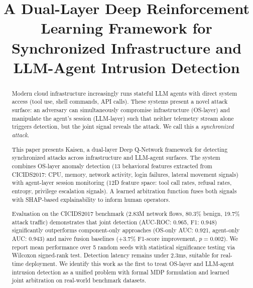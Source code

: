 \documentclass[conference]{IEEEtran}
\begin{document}
\title{A Dual-Layer Deep Reinforcement Learning Framework for Synchronized Infrastructure and LLM-Agent Intrusion Detection}

\author{
}

\maketitle

\begin{abstract}
Modern cloud infrastructure increasingly runs stateful LLM agents with direct system access (tool use, shell commands, API calls). These systems present a novel attack surface: an adversary can simultaneously compromise infrastructure (OS-layer) and manipulate the agent's session (LLM-layer) such that neither telemetry stream alone triggers detection, but the joint signal reveals the attack. We call this a \emph{synchronized attack}.

This paper presents Kaisen, a dual-layer Deep Q-Network framework for detecting synchronized attacks across infrastructure and LLM-agent surfaces. The system combines OS-layer anomaly detection (13 behavioral features extracted from CICIDS2017: CPU, memory, network activity, login failures, lateral movement signals) with agent-layer session monitoring (12D feature space: tool call rates, refusal rates, entropy, privilege escalation signals). A learned arbitration function fuses both signals with SHAP-based explainability to inform human operators.

Evaluation on the CICIDS2017 benchmark (2.83M network flows, 80.3\% benign, 19.7\% attack traffic) demonstrates that joint detection (AUC-ROC: 0.965, F1: 0.948) significantly outperforms component-only approaches (OS-only AUC: 0.921, agent-only AUC: 0.943) and naive fusion baselines (+3.7\% F1-score improvement, $p=0.002$). We report mean performance over 5 random seeds with statistical significance testing via Wilcoxon signed-rank test. Detection latency remains under 2.3ms, suitable for real-time deployment. We identify this work as the first to treat OS-layer and LLM-agent intrusion detection as a unified problem with formal MDP formulation and learned joint arbitration on real-world benchmark datasets.
\end{abstract}
\end{document}
